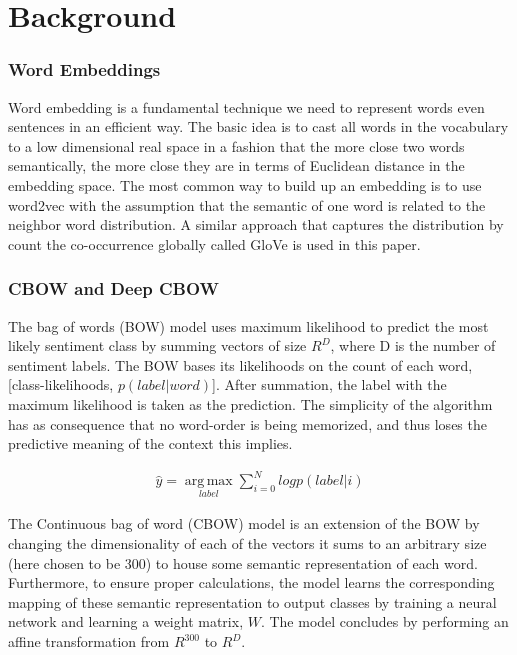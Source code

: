 \section{Background}
\label{sec: background}
\subsubsection{Word Embeddings}
Word embedding is a fundamental technique we need to represent words even
sentences in an efficient way. The basic idea is to cast all words in the
vocabulary to a low dimensional real space in a fashion that the more close two
words semantically, the more close they are in terms of Euclidean distance in
the embedding space. The most common way to build up an embedding is to use
word2vec\cite{mikolov2013distributed} with the assumption that the semantic of
one word is related to the neighbor word distribution. A similar approach that
captures the distribution by count the co-occurrence globally called
GloVe\cite{pennington2014glove} is used in this paper.

\subsubsection{CBOW and Deep CBOW}
The bag of words (BOW) model uses maximum likelihood to predict the most likely
sentiment class by summing vectors of size $R^{D}$, where D is the number of
sentiment labels. The BOW bases its likelihoods on the count of each word,
[class-likelihoods, $p(label|word)$]. After summation, the label with the
maximum likelihood is taken as the prediction. The simplicity of the algorithm
has as consequence that no word-order is being memorized, and thus loses the
predictive meaning of the context this implies.

\begin{align*}
    \hat{y} = \operatorname*{arg\,max}_{label} \sum^{N}_{i=0} log p(label|i)
\end{align*}

The Continuous bag of word (CBOW) model is an extension of the BOW by changing
the dimensionality of each of the vectors it sums to an arbitrary size (here
chosen to be 300) to house some semantic representation of each word.
Furthermore, to ensure proper calculations, the model learns the corresponding
mapping of these semantic representation to output classes by training a neural
network and learning a weight matrix, $W$. The model concludes by performing an
affine transformation from $R^{300}$ to $R^D$.

